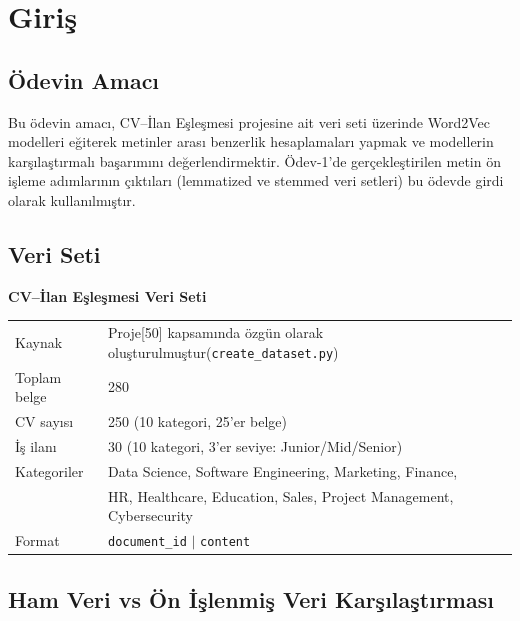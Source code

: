 \documentclass[12pt, a4paper]{article}
\begin{document}
\tableofcontents
\newpage

\section{Giriş}

\subsection{Ödevin Amacı}

Bu ödevin amacı, CV--İlan Eşleşmesi projesine ait veri seti üzerinde Word2Vec modelleri eğiterek metinler arası benzerlik hesaplamaları yapmak ve modellerin karşılaştırmalı başarımını değerlendirmektir. Ödev-1'de gerçekleştirilen metin ön işleme adımlarının çıktıları (lemmatized ve stemmed veri setleri) bu ödevde girdi olarak kullanılmıştır.

\subsection{Veri Seti}

\begin{mdframed}[style=bilgi, rightmargin=-1cm]
\textbf{CV--İlan Eşleşmesi Veri Seti}\\[0.3cm]
\begin{tabular}{ll}
Kaynak       & Proje[50] kapsamında özgün olarak oluşturulmuştur(\texttt{create\_dataset.py})\\
Toplam belge & 280 \\
CV sayısı    & 250 (10 kategori, 25'er belge) \\
İş ilanı     & 30 (10 kategori, 3'er seviye: Junior/Mid/Senior) \\
Kategoriler  & Data Science, Software Engineering, Marketing, Finance, \\
             & HR, Healthcare, Education, Sales, Project Management, Cybersecurity \\
Format       & \texttt{document\_id} $|$ \texttt{content} \\
\end{tabular}
\end{mdframed}

\subsection{Ham Veri vs Ön İşlenmiş Veri Karşılaştırması}
\end{document}
